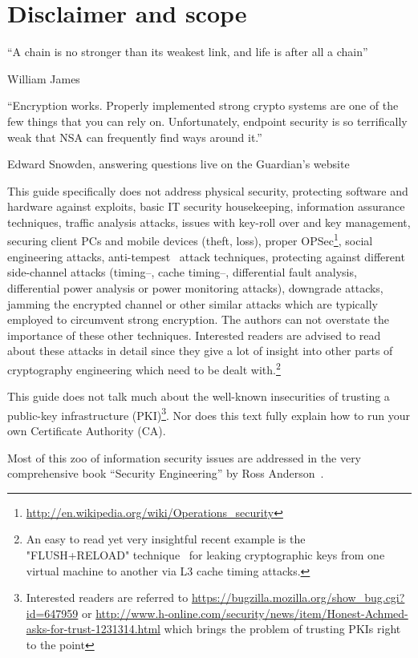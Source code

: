 \section{Disclaimer and scope}
\label{section:disclaimer}
\label{sec:disclaimer-scope}

\epigraph{``A chain is no stronger than its weakest link, and life is after all a chain''}{William James}
\epigraph{``Encryption works. Properly implemented strong crypto systems are
one of the few things that you can rely on. Unfortunately, endpoint security is
so terrifically weak that NSA can frequently find ways around it.''}{Edward
Snowden, answering questions live on the Guardian's
website~\cite{snowdenGuardianGreenwald}}


This guide specifically does not address physical security, protecting software
and hardware against exploits, basic IT security housekeeping, information
assurance techniques, traffic analysis attacks, issues with key-roll over and
key management, securing client PCs and mobile devices (theft, loss), proper
OPSec\footnote{\url{http://en.wikipedia.org/wiki/Operations_security}}, social
engineering attacks, anti-tempest~\cite{Wikipedia:Tempest} attack techniques,
protecting against different side-channel attacks (timing--, cache timing--,
differential fault analysis, differential power analysis or power monitoring
attacks), downgrade attacks, jamming the encrypted channel or other similar
attacks which are typically employed to circumvent strong encryption.  The
authors can not overstate the importance of these other techniques.  Interested
readers are advised to read about these attacks in detail since they give a lot
of insight into other parts of cryptography engineering which need to be dealt
with.\footnote{An easy to read yet very insightful recent example is the
"FLUSH+RELOAD" technique~\cite{yarom2013flush+} for leaking cryptographic keys
from one virtual machine to another via L3 cache timing attacks.}

This guide does not talk much about the well-known insecurities of trusting a
public-key infrastructure (PKI)\footnote{Interested readers are referred to
\url{https://bugzilla.mozilla.org/show_bug.cgi?id=647959} or
\url{http://www.h-online.com/security/news/item/Honest-Achmed-asks-for-trust-1231314.html}
which brings the problem of trusting PKIs right to the point}. Nor
does this text fully explain how to run your own Certificate Authority (CA). 


Most of this zoo of information security issues are addressed in the very
comprehensive book ``Security Engineering'' by Ross Anderson~\cite{anderson2008security}. 

